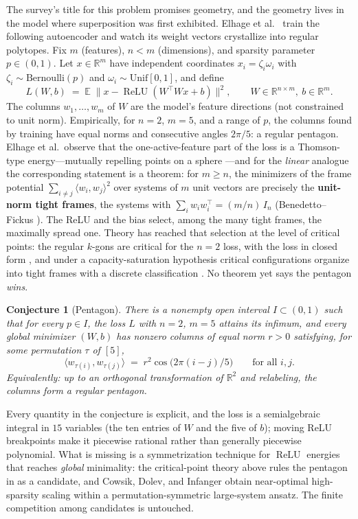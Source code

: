 \documentclass[11pt]{amsart}
\theoremstyle{plain}
\newtheorem{conjecture}[theorem]{Conjecture}
\theoremstyle{definition}
\newcommand{\R}{\mathbb{R}}
\newcommand{\E}{\mathbb{E}}
\DeclareMathOperator{\relu}{ReLU}
\begin{document}
The survey's title for this problem promises geometry, and the geometry lives in the model where superposition was first exhibited. Elhage et al.~\cite{elhage2022} train the following autoencoder and watch its weight vectors crystallize into regular polytopes. Fix $m$ (features), $n<m$ (dimensions), and sparsity parameter $p\in(0,1)$. Let $x\in\R^m$ have independent coordinates $x_i=\zeta_i\omega_i$ with $\zeta_i\sim\mathrm{Bernoulli}(p)$ and $\omega_i\sim\mathrm{Unif}[0,1]$, and define
\[
  L(W,b)\;=\;\E\;\bigl\lVert x-\relu(W^{\!\top}W x+b)\bigr\rVert^2,
  \qquad W\in\R^{n\times m},\ b\in\R^m .
\]
The columns $w_1,\dots,w_m$ of $W$ are the model's feature directions (not constrained to unit norm). Empirically, for $n=2$, $m=5$, and a range of $p$, the columns found by training have equal norms and consecutive angles $2\pi/5$: a regular pentagon. Elhage et al.\ observe that the one-active-feature part of the loss is a Thomson-type energy---mutually repelling points on a sphere \cite{saff1997}---and for the \emph{linear} analogue the corresponding statement is a theorem: for $m\ge n$, the minimizers of the frame potential $\sum_{i\neq j}\langle w_i,w_j\rangle^2$ over systems of $m$ unit vectors are precisely the \textbf{unit-norm tight frames}, the systems with $\sum_i w_iw_i^{\!\top}=(m/n)\,I_n$ (Benedetto--Fickus \cite{benedetto2003}). The ReLU and the bias select, among the many tight frames, the maximally spread one. Theory has reached that selection at the level of critical points: the regular $k$-gons are critical for the $n=2$ loss, with the loss in closed form \cite{chen2023}, and under a capacity-saturation hypothesis critical configurations organize into tight frames with a discrete classification \cite{ivanov2026}. No theorem yet says the pentagon \emph{wins}.

\begin{conjecture}[Pentagon]\label{conj:pentagon}
There is a nonempty open interval $I\subset(0,1)$ such that for every $p\in I$, the loss $L$ with $n=2$, $m=5$ attains its infimum, and every global minimizer $(W,b)$ has nonzero columns of equal norm $r>0$ satisfying, for some permutation $\tau$ of $[5]$,
\[
  \langle w_{\tau(i)},w_{\tau(j)}\rangle\;=\;r^2\cos\bigl(2\pi(i-j)/5\bigr)
  \qquad\text{for all } i,j .
\]
Equivalently: up to an orthogonal transformation of $\R^2$ and relabeling, the columns form a regular pentagon.
\end{conjecture}

Every quantity in the conjecture is explicit, and the loss is a semialgebraic integral in $15$ variables (the ten entries of $W$ and the five of $b$); moving ReLU breakpoints make it piecewise rational rather than generally piecewise polynomial. What is missing is a symmetrization technique for $\relu$ energies that reaches \emph{global} minimality: the critical-point theory above \cite{chen2023,ivanov2026} rules the pentagon in as a candidate, and Cowsik, Dolev, and Infanger \cite{cowsik2024} obtain near-optimal high-sparsity scaling within a permutation-symmetric large-system ansatz. The finite competition among candidates is untouched.
\end{document}
